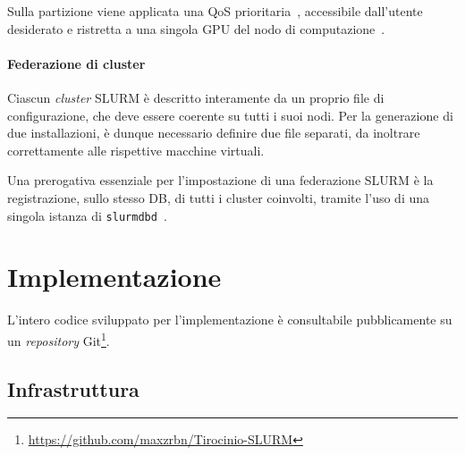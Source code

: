 \documentclass[12pt,a4paper,twoside,openright]{book}
\begin{document}
Sulla partizione viene applicata una \acf{QoS} prioritaria~\cite{slurmqos}, accessibile dall'utente desiderato e ristretta a una singola \ac{GPU} del nodo di computazione~\cite{slurmlimits}.

\subsubsection{Federazione di cluster}
Ciascun \textit{cluster} \ac{SLURM} è descritto interamente da un proprio file di configurazione, che deve essere coerente su tutti i suoi nodi. Per la generazione di due installazioni, è dunque necessario definire due file separati, da inoltrare correttamente alle rispettive macchine virtuali.

Una prerogativa essenziale per l'impostazione di una federazione \ac{SLURM} è la registrazione, sullo stesso \ac{DB}, di tutti i cluster coinvolti, tramite l'uso di una singola istanza di \texttt{slurmdbd}~\cite{slurmfederation}.


\chapter{Implementazione} %
L'intero codice sviluppato per l'implementazione è consultabile pubblicamente su un \textit{repository} Git\footnote{\url{https://github.com/maxzrbn/Tirocinio-SLURM}}.

\section{Infrastruttura}
\end{document}
